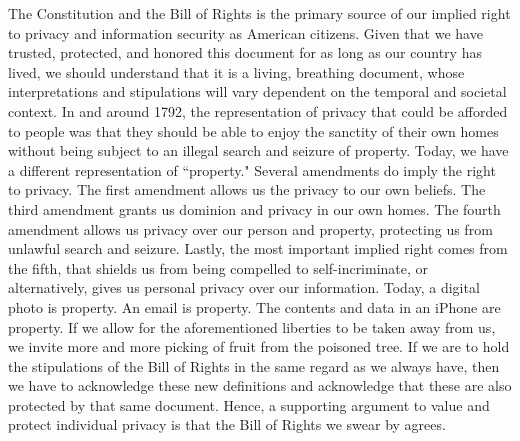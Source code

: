 \documentclass[12pt]{article}
\begin{document}
\begin{flushleft}
    \par The Constitution and the Bill of Rights is the primary source of our 
    implied right to privacy and information security as American citizens.  
    Given that we have trusted, protected, and honored this document for as long 
    as our country has lived, we should understand that it is a living, 
    breathing document, whose interpretations and stipulations will vary 
    dependent on the temporal and societal context. In and around 1792, the 
    representation of privacy that could be afforded to people was that they 
    should be able to enjoy the sanctity of their own homes without being 
    subject to an illegal search and seizure of property. Today, we have a 
    different representation of ``property." Several amendments do imply the 
    right to privacy. The first amendment allows us the privacy to our own 
    beliefs. The third amendment grants us dominion and privacy in our own 
    homes. The fourth amendment allows us privacy over our person and property, 
    protecting us from unlawful search and seizure. Lastly, the most important 
    implied right comes from the fifth, that shields us from being compelled to 
    self-incriminate, or alternatively, gives us personal privacy over our 
    information. Today, a digital photo is property. An email is property. The 
    contents and data in an iPhone are property. If we allow for the 
    aforementioned liberties to be taken away from us, we invite more and more 
    picking of fruit from the poisoned tree. If we are to hold the stipulations 
    of the Bill of Rights in the same regard as we always have, then we have to 
    acknowledge these new definitions and acknowledge that these are also 
    protected by that same document. Hence, a supporting argument to value and 
    protect individual privacy is that the Bill of Rights we swear by agrees.
    

\end{flushleft}
\end{document}
